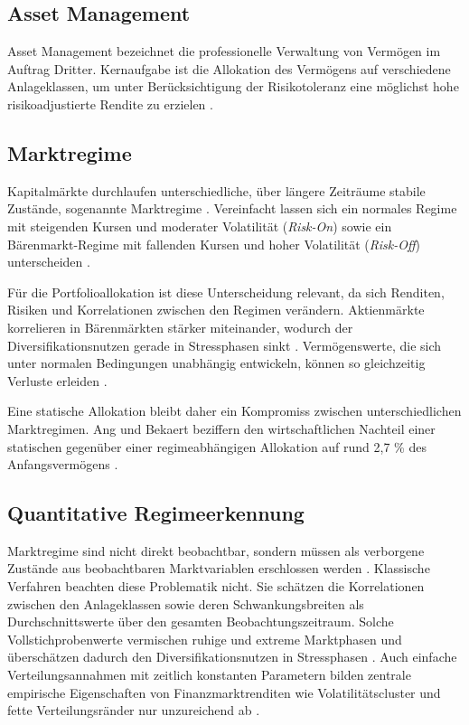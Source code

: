 \subsection{Asset Management}
Asset Management bezeichnet die professionelle Verwaltung von Vermögen im Auftrag Dritter. Kernaufgabe ist die Allokation des Vermögens auf verschiedene Anlageklassen, um unter Berücksichtigung der Risikotoleranz eine möglichst hohe risikoadjustierte Rendite zu erzielen \cite[2-4]{maginn_managing_2007}.

\subsection{Marktregime}
Kapitalmärkte durchlaufen unterschiedliche, über längere Zeiträume stabile Zustände, sogenannte Marktregime \cite[313–314]{ang_regime_2012}. Vereinfacht lassen sich ein normales Regime mit steigenden Kursen und moderater Volatilität (\textit{Risk-On}) sowie ein Bärenmarkt-Regime mit fallenden Kursen und hoher Volatilität (\textit{Risk-Off}) unterscheiden \cite[1139]{ang_international_2002}.

\vspace{0.5cm}

Für die Portfolioallokation ist diese Unterscheidung relevant, da sich Renditen, Risiken und Korrelationen zwischen den Regimen verändern. Aktienmärkte korrelieren in Bärenmärkten stärker miteinander, wodurch der Diversifikationsnutzen gerade in Stressphasen sinkt \cite[1137]{ang_international_2002}. Vermögenswerte, die sich unter normalen Bedingungen unabhängig entwickeln, können so gleichzeitig Verluste erleiden \cite[19]{page_when_2018}.

\vspace{0.5cm}

Eine statische Allokation bleibt daher ein Kompromiss zwischen unterschiedlichen Marktregimen. Ang und Bekaert beziffern den wirtschaftlichen Nachteil einer statischen gegenüber einer regimeabhängigen Allokation auf rund 2,7 \% des Anfangsvermögens \cite[1182]{ang_international_2002}.


\subsection{Quantitative Regimeerkennung}
Marktregime sind nicht direkt beobachtbar, sondern müssen als verborgene Zustände aus beobachtbaren Marktvariablen erschlossen werden \cite[323]{ang_regime_2012}. Klassische Verfahren beachten diese Problematik nicht. Sie schätzen die Korrelationen zwischen den Anlageklassen sowie deren Schwankungsbreiten als Durchschnittswerte über den gesamten Beobachtungszeitraum. Solche Vollstichprobenwerte vermischen ruhige und extreme Marktphasen und überschätzen dadurch den Diversifikationsnutzen in Stressphasen \cite[21-23]{page_when_2018}. Auch einfache Verteilungsannahmen mit zeitlich konstanten Parametern bilden zentrale empirische Eigenschaften von Finanzmarktrenditen wie Volatilitätscluster und fette Verteilungsränder nur unzureichend ab \cite[224-230]{cont_empirical_2001}.

